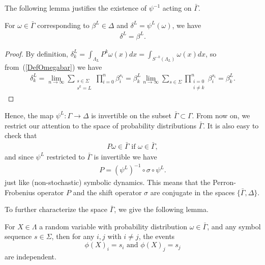 \documentclass[final]{siamltex}
\begin{document}
The following lemma justifies the existence of $\psi^{-1}$ acting on
$\bar{\Gamma}$.
\begin{lemma} For $\omega \in \bar{\Gamma}$ corresponding to $\beta^L
  \in \Delta$ and $\delta^L = \psi^L(\omega)$, we have
 \begin{align}
    \delta^L = \beta^L.
 \end{align}
\end{lemma}
\begin{proof} By definition, $\delta_{k}^L = \int_{\Lambda_L}
  P^{k} \omega(x)dx = \int_{S^{-k}(\Lambda_L)} \omega(x)dx$, so
  from~(\ref{DefOmegabar}) we have
  \begin{align*}
    \delta_{k}^L = \lim_{n \to \infty} \sum_{\substack{s\in
        \Sigma\\s^k= L }} \prod_{i=0}^{n} \beta^{s_i}_i = \beta_k^L
    \lim_{n \to \infty} \sum_{s\in \Sigma} \prod_{\substack{i=0\\
        i\neq k}}^{n} \beta^{s_i}_i = \beta_k^L.
  \end{align*}
\end{proof}

Hence, the map $\psi^L : \Gamma \to \Delta$ is invertible on the
subset $\bar{\Gamma} \subset \Gamma$. From now on, we restrict our
attention to the space of probability distributions $\bar{\Gamma}$. It
is also easy to check that
 \begin{align}
 \label{Pconserve}
  P \omega \in \bar{\Gamma} \text{ if } \omega \in \bar{\Gamma},
 \end{align}
and since $\psi^L$ restricted to $\bar{\Gamma}$ is invertible we have
\begin{align}
  P = (\psi^L)^{-1}\circ \sigma \circ \psi^L.
\end{align}
just like (non-stochastic) symbolic dynamics. This means that the
Perron-Frobenius operator $P$ and the shift operator $\sigma$ are
conjugate in the spaces $\{\bar{\Gamma},\Delta \}$.

To further characterize the space $\bar{\Gamma}$, we give the
following lemma.

\begin{lemma}
  \label{lemma:independency}
  For $X \in \Lambda$ a random variable with probability distribution
  $\omega \in \bar{\Gamma}$, and any symbol sequence $s \in \Sigma$,
  then for any $i,j$ with $i\neq j$, the events
  \begin{equation}
    \phi(X)_i=s_i \text{ and } \phi(X)_j=s_j
  \end{equation}
  are independent.
\end{lemma}
\end{document}
